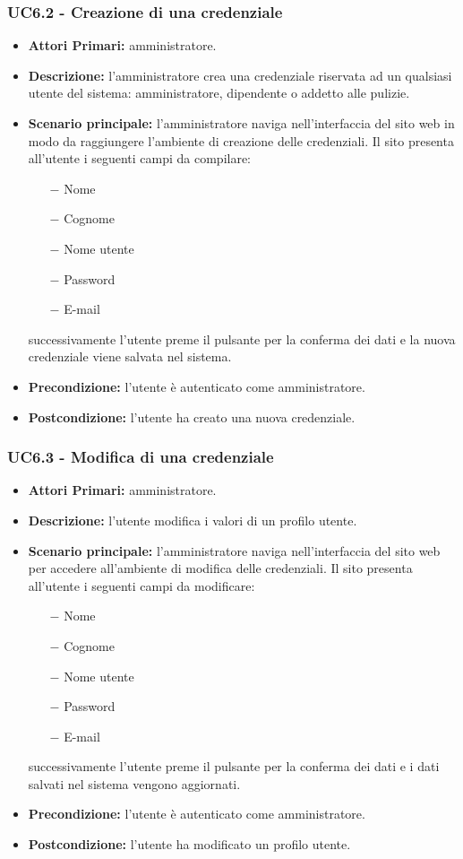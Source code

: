 \subsubsection{ UC6.2 - Creazione di una credenziale}
\begin{itemize}
	\item\textbf{Attori Primari:}
	amministratore.
	\item\textbf{Descrizione:} 
	l'amministratore crea una credenziale riservata ad un qualsiasi utente del sistema: amministratore, dipendente o addetto alle pulizie.
	\item\textbf{Scenario principale:} 
	l'amministratore naviga nell'interfaccia del sito web in modo da raggiungere l'ambiente di creazione delle credenziali.
	Il sito presenta all'utente i seguenti campi da compilare:
	\begin{itemize}
		\item[$-$] Nome
		\item[$-$] Cognome
		\item[$-$] Nome utente
		\item[$-$] Password
		\item[$-$] E-mail
	\end{itemize}
	successivamente l'utente preme il pulsante per la conferma dei dati e la nuova credenziale viene salvata nel sistema.
	\item\textbf{Precondizione:} 
	l'utente è autenticato come amministratore.
	\item\textbf{Postcondizione:}
	l'utente ha creato una nuova credenziale.
\end{itemize}

\subsubsection{ UC6.3 - Modifica di una credenziale}
\begin{itemize}
	\item\textbf{Attori Primari:} 
	amministratore.
	\item\textbf{Descrizione:} 
	l'utente modifica i valori di un profilo utente.
	\item\textbf{Scenario principale:} 
	l'amministratore naviga nell'interfaccia del sito web per accedere all'ambiente di modifica delle credenziali.
	Il sito presenta all'utente i seguenti campi da modificare:
	\begin{itemize}
		\item[$-$] Nome
		\item[$-$] Cognome
		\item[$-$] Nome utente
		\item[$-$] Password
		\item[$-$] E-mail
	\end{itemize}
	successivamente l'utente preme il pulsante per la conferma dei dati e i dati salvati nel sistema vengono aggiornati.
	\item\textbf{Precondizione:} 
	l'utente è autenticato come amministratore.
	\item\textbf{Postcondizione:}
	l'utente ha modificato un profilo utente.
\end{itemize}

